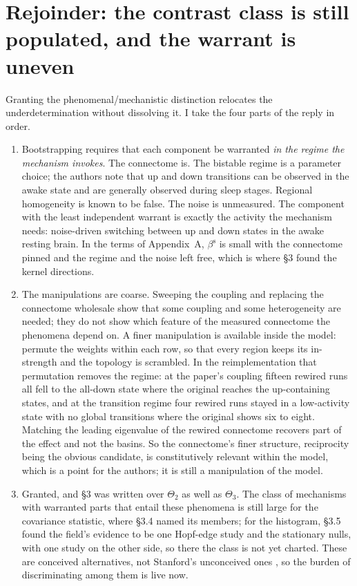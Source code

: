\documentclass[11pt]{article}
\begin{document}
\section{Rejoinder: the contrast class is still populated, and the warrant is uneven}
Granting the phenomenal/mechanistic distinction relocates the underdetermination without dissolving it. I take the four parts of the reply in order.
\begin{enumerate}
\item[To R1] Bootstrapping requires that each component be warranted \emph{in the regime the mechanism invokes}. The connectome is. The bistable regime is a parameter choice; the authors note that up and down transitions can be observed in the awake state and are generally observed during sleep stages. Regional homogeneity is known to be false. The noise is unmeasured. The component with the least independent warrant is exactly the activity the mechanism needs: noise-driven switching between up and down states in the awake resting brain. In the terms of Appendix~A, $\beta^{\mathrm{s}}$ is small with the connectome pinned and the regime and the noise left free, which is where \S3 found the kernel directions.
\item[To R2] The manipulations are coarse. Sweeping the coupling and replacing the connectome wholesale show that some coupling and some heterogeneity are needed; they do not show which feature of the measured connectome the phenomena depend on. A finer manipulation is available inside the model: permute the weights within each row, so that every region keeps its in-strength and the topology is scrambled. In the reimplementation that permutation removes the regime: at the paper's coupling fifteen rewired runs all fell to the all-down state where the original reaches the up-containing states, and at the transition regime four rewired runs stayed in a low-activity state with no global transitions where the original shows six to eight. Matching the leading eigenvalue of the rewired connectome recovers part of the effect and not the basins. So the connectome's finer structure, reciprocity being the obvious candidate, is constitutively relevant within the model, which is a point for the authors; it is still a manipulation of the model.
\item[To R3] Granted, and \S3 was written over $\Theta_2$ as well as $\Theta_3$. The class of mechanisms with warranted parts that entail these phenomena is still large for the covariance statistic, where \S3.4 named its members; for the histogram, \S3.5 found the field's evidence to be one Hopf-edge study and the stationary nulls, with one study on the other side, so there the class is not yet charted. These are conceived alternatives, not Stanford's unconceived ones \parencite{stanford2006}, so the burden of discriminating among them is live now.

\end{enumerate}
\end{document}
